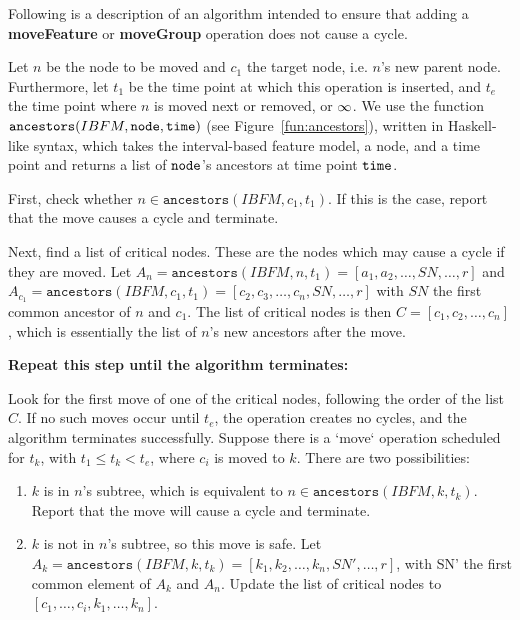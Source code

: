 Following is a description of an algorithm intended to ensure that adding a \textbf{moveFeature} or \textbf{moveGroup} operation does not cause a cycle.

Let $n$ be the node to be moved and $c_1$ the target node, i.e. $n$'s new parent node. Furthermore, let $t_1$ be the time point at which this operation is inserted, and $t_e$ the time point where $n$ is moved next or removed, or $\infty$. We use the function $\texttt{ancestors}(IBFM, \texttt{node}, \texttt{time})$ (see Figure~\vref{fun:ancestors}), written in Haskell-like syntax, which takes the interval-based feature model, a node, and a time point and returns a list of $\texttt{node}$'s ancestors at time point $\texttt{time}$.

First, check whether $n \in \texttt{ancestors}(IBFM, c_1, t_1)$. If this is the case, report that the move causes a cycle and terminate. 

Next, find a list of critical nodes. These are the nodes which may cause a cycle if they are moved. 
Let $A_n = \texttt{ancestors}(IBFM, n, t_1) = [a_1, a_2, \dots, SN, \dots, r]$ and $A_{c_1} = \texttt{ancestors}(IBFM, c_1, t_1) = [c_2 \comma c_3 \comma \dots \comma c_n \comma SN \comma \dots \comma r]$ with $SN$ the first common ancestor of $n$ and $c_1$. The list of critical nodes is then $C = [c_1, c_2, \dots, c_n]$, which is essentially the list of $n$'s new ancestors after the move. 

\textbf{Repeat this step until the algorithm terminates:}

Look for the first move of one of the critical nodes, following the order of the list $C$. If no such moves occur until $t_e$, the operation creates no cycles, and the algorithm terminates successfully.  
  Suppose there is a `move` operation scheduled for $t_k$, with $t_1 \leq t_k < t_e$, where $c_i$ is moved to $k$. There are two possibilities:  
  \begin{enumerate}
    \item $k$ is in $n$'s subtree, which is equivalent to $n \in \texttt{ancestors}(IBFM, k, t_k)$. Report that the move will cause a cycle and terminate. 
\item $k$ is not in $n$'s subtree, so this move is safe. Let $A_k = \texttt{ancestors}(IBFM, k, t_k) = [k_1, k_2, \dots, k_n, SN', \dots, r]$, with SN' the first common element of $A_k$ and $A_n$. Update the list of critical nodes to $[c_1, \dots, c_i, k_1, \dots, k_n]$.
  \end{enumerate}


